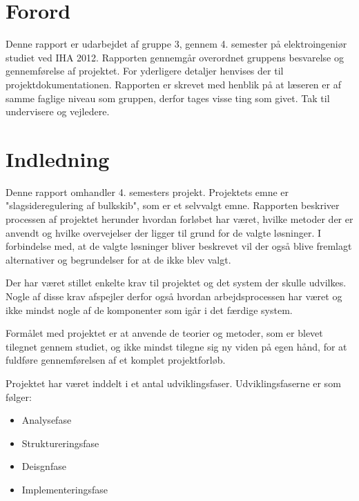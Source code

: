\chapter{Forord}
Denne rapport er udarbejdet af gruppe 3, gennem 4. semester på elektroingeniør studiet ved IHA 2012. Rapporten gennemgår overordnet gruppens besvarelse og gennemførelse af projektet. For yderligere detaljer henvises der til projektdokumentationen. Rapporten er skrevet med henblik på at læseren er af samme faglige niveau som gruppen, derfor tages visse ting som givet. Tak til undervisere og vejledere.


\chapter{Indledning}
Denne rapport omhandler 4. semesters projekt. Projektets emne er "slagsideregulering af bulkskib", som er et selvvalgt emne. Rapporten beskriver processen af projektet herunder hvordan forløbet har været, hvilke metoder der er anvendt og hvilke overvejelser der ligger til grund for de valgte løsninger. I forbindelse med, at de valgte løsninger bliver beskrevet vil der også blive fremlagt alternativer og begrundelser for at de ikke blev valgt.

Der har været stillet enkelte krav til projektet og det system der skulle udvilkes. Nogle af disse krav afspejler derfor også hvordan arbejdsprocessen har været og ikke mindst nogle af de komponenter som igår i det færdige system. 

Formålet med projektet er at anvende de teorier og metoder, som er blevet tilegnet gennem studiet, og ikke mindst tilegne sig ny viden på egen hånd, for at fuldføre gennemførelsen af et komplet projektforløb.

Projektet har været inddelt i et antal udviklingsfaser. Udviklingsfaserne er som følger:
\begin{itemize}
\item Analysefase
\item Struktureringsfase
\item Deisgnfase
\item Implementeringsfase
\end{itemize}


